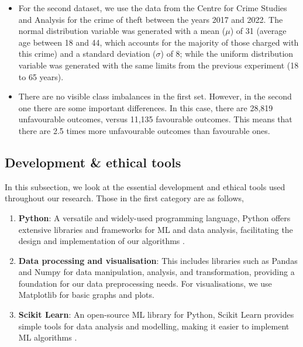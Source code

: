 \documentclass[fleqn,10pt]{wlscirep}
\begin{document}
\begin{itemize}
        \item For the second dataset, we use the data from the Centre for Crime Studies and Analysis \cite{PortalCEAD} for the crime of theft between the years 2017 and 2022. The normal distribution variable was generated with a mean ($\mu$) of 31 (average age between 18 and 44, which accounts for the majority of those charged with this crime) and a standard deviation ($\sigma$) of 8; while the uniform distribution variable was generated with the same limits from the previous experiment (18 to 65 years). 

        \item There are no visible class imbalances in the first set. However, in the second one there are some important differences. In this case, there are 28,819 unfavourable outcomes, versus 11,135 favourable outcomes. This means that there are 2.5 times more unfavourable outcomes than favourable ones.

    \end{itemize}

\subsection{Development \& ethical tools}

In this subsection, we look at the essential development and ethical tools used throughout our research. Those in the first category are as follows,

\begin{enumerate}
    \item \textbf{Python}: A versatile and widely-used programming language, Python offers extensive libraries and frameworks for ML and data analysis, facilitating the design and implementation of our algorithms \cite{10.5555/1593511}.

    \item \textbf{Data processing and visualisation}: This includes libraries such as Pandas \cite{reback2020pandas} and Numpy \cite{harris2020array} for data manipulation, analysis, and transformation, providing a foundation for our data preprocessing needs. For visualisations, we use Matplotlib \cite{Hunter:2007} for basic graphs and plots.

    \item \textbf{Scikit Learn}: An open-source ML library for Python, Scikit Learn provides simple tools for data analysis and modelling, making it easier to implement ML algorithms \cite{scikit-learn}.
\end{enumerate}
\end{document}
